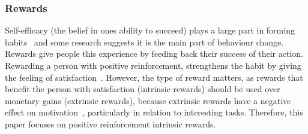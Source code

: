 \documentclass{scaffold/sigchi}
\begin{document}
\subsubsection{Rewards}
Self-efficacy (the belief in ones ability to succeed) plays a large part in forming habits~\cite{article_a_self_efficacy} and some research suggests it is the main part of behaviour change. Rewards give people this experience by feeding back their success of their action. Rewarding a person with positive reinforcement, strengthens the habit by giving the feeling of satisfaction~\cite{article_promoting_habit_formation}. However, the type of reward matters, as rewards that benefit the person with satisfaction (intrinsic rewards) should be used over monetary gains (extrinsic rewards), because extrinsic rewards have a negative effect on motivation~\cite{article_meta_analytic_review_intrinsic_motivation}, particularly in relation to interesting tasks. Therefore, this paper focuses on positive reinforcement intrinsic rewards.
\end{document}
